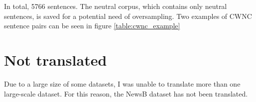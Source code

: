 


In total, 5766 sentences. The neutral corpus, which contains only neutral sentences, is saved for a potential need of oversampling. Two examples of CWNC sentence pairs can be seen in figure \ref{table:cwnc_example}





\section{Not translated}
Due to a large size of some datasets, I was unable to translate more than one large-scale dataset. For this reason, the NewsB dataset has not been translated.